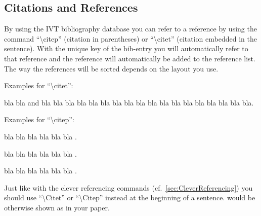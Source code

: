 \subsection{Citations and References}

By using the IVT bibliography database you can refer to a reference by
using the command ``\textbackslash{}citep'' (citation in parentheses)
or ``\textbackslash{}citet''
(citation embedded in the sentence). With the unique key of the
bib-entry you will automatically refer to that reference and the
reference will automatically be added to the reference list. The way
the references will be sorted depends on the layout you use. 

Examples for ``\textbackslash{}citet'':

bla bla 
\citet{matsimbook} and \citet{axhausen2008income} 
bla bla bla bla bla bla bla bla bla bla
\citet{axhausen2008income,matsimbook}
bla bla bla bla bla bla bla bla.

Examples for ``\textbackslash{}citep'':

bla bla bla bla bla bla
\citep[e.g.,]{matsimbook,axhausen2008income}.

bla bla bla bla bla bla \citep[see also][pp.325-378]{axhausen2008income}.

bla bla bla bla bla bla \citep{axhausen2008income}.

Just like with the clever referencing commands (cf.~\cref{sec:CleverReferencing})
you should use ``\textbackslash{}Citet'' or ``\textbackslash{}Citep'' instead
at the beginning of a sentence.
would be otherwise shown as \citet{axhausen2008income}
in your paper.

